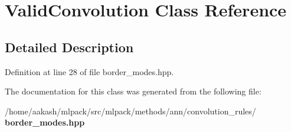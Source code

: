 \section{Valid\+Convolution Class Reference}
\label{classmlpack_1_1ann_1_1ValidConvolution}


\subsection{Detailed Description}


Definition at line 28 of file border\+\_\+modes.\+hpp.



The documentation for this class was generated from the following file\+:\begin{DoxyCompactItemize}
\item 
/home/aakash/mlpack/src/mlpack/methods/ann/convolution\+\_\+rules/\textbf{ border\+\_\+modes.\+hpp}\end{DoxyCompactItemize}

